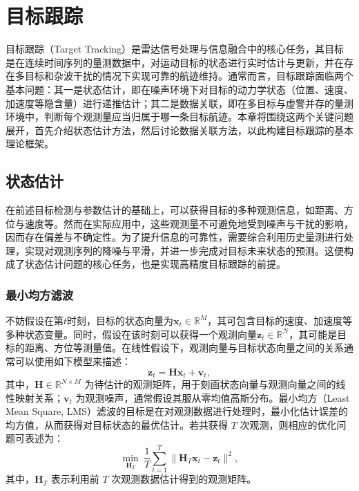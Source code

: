 \chapter{目标跟踪}

目标跟踪（Target Tracking）是雷达信号处理与信息融合中的核心任务，其目标是在连续时间序列的量测数据中，对运动目标的状态进行实时估计与更新，并在存在多目标和杂波干扰的情况下实现可靠的航迹维持。通常而言，目标跟踪面临两个基本问题：其一是状态估计，即在噪声环境下对目标的动力学状态（位置、速度、加速度等隐含量）进行递推估计；其二是数据关联，即在多目标与虚警并存的量测环境中，判断每个观测量应当归属于哪一条目标航迹。本章将围绕这两个关键问题展开，首先介绍状态估计方法，然后讨论数据关联方法，以此构建目标跟踪的基本理论框架。

\section{状态估计}
在前述目标检测与参数估计的基础上，可以获得目标的多种观测信息，如距离、方位与速度等。然而在实际应用中，这些观测量不可避免地受到噪声与干扰的影响，因而存在偏差与不确定性。为了提升信息的可靠性，需要综合利用历史量测进行处理，实现对观测序列的降噪与平滑，并进一步完成对目标未来状态的预测。这便构成了状态估计问题的核心任务，也是实现高精度目标跟踪的前提。

\subsection{最小均方滤波}

不妨假设在第\( t \)时刻，目标的状态向量为\( \bm{x}_t \in \mathbb{R}^M \)，其可包含目标的速度、加速度等多种状态变量。同时，假设在该时刻可以获得一个观测向量\( \bm{z}_t \in \mathbb{R}^N \)，其可能是目标的距离、方位等测量值。在线性假设下，观测向量与目标状态向量之间的关系通常可以使用如下模型来描述：
\[
    \bm{z}_t = \mathbf{H} \bm{x}_t + \bm{v}_t,
\]
其中，$\mathbf{H} \in \mathbb{R}^{N \times M}$ 为待估计的观测矩阵，用于刻画状态向量与观测向量之间的线性映射关系；$\bm{v}_t$ 为观测噪声，通常假设其服从零均值高斯分布。最小均方（Least Mean Square, LMS）滤波的目标是在对观测数据进行处理时，最小化估计误差的均方值，从而获得对目标状态的最优估计。若共获得 $T$ 次观测，则相应的优化问题可表述为：
\[
    \min_{\mathbf{H}_T} \ \frac{1}{T}\sum_{t=1}^{T} \big\| \mathbf{H}_T\bm{x}_t - \bm{z}_t \big\|^2,
\]
其中，\( \mathbf{H}_T \) 表示利用前 \( T \) 次观测数据估计得到的观测矩阵。

